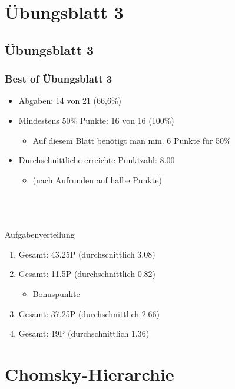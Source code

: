 



\section{Übungsblatt 3}
\subsection{Übungsblatt 3}

\begin{frame}
\frametitle{Best of Übungsblatt 3}
\begin{itemize}
	\item Abgaben: 14 von 21 (66,6\%)
	\item Mindestens 50\% Punkte: 16 von 16 (100\%)
	\begin{itemize}
		\item Auf diesem Blatt benötigt man min. 6 Punkte für 50\%
	\end{itemize}
	\item Durchschnittliche erreichte Punktzahl: 8.00
	\begin{itemize}
		\item (nach Aufrunden auf halbe Punkte)
	\end{itemize}
\end{itemize}~\\~\\~\\
Aufgabenverteilung
\begin{enumerate}[{A}ufg{a}be 1:]
	\item Gesamt: 43.25P (durchscnittlich 3.08)
	\item Gesamt: 11.5P (durchschnittlich 0.82)
	\begin{itemize}
		\item \glqq Bonuspunkte\grqq
	\end{itemize}
	\item Gesamt: 37.25P (durchschnittlich 2.66)
	\item Gesamt: 19P (durchschnittlich 1.36)
\end{enumerate}
\end{frame}

\section{Chomsky-Hierarchie}
